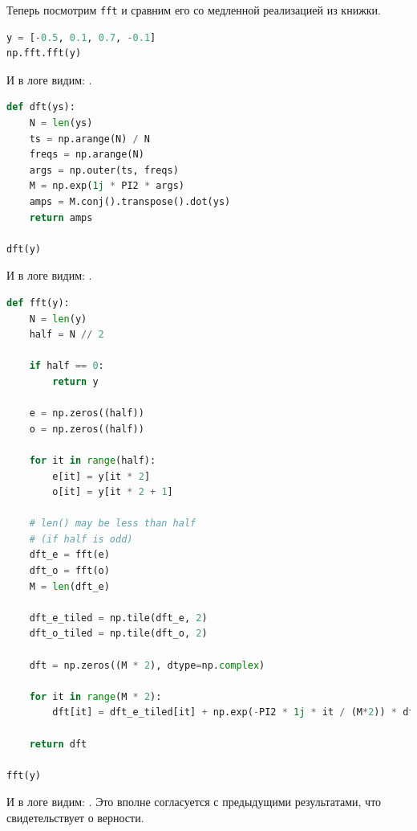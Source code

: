 \documentclass[a4paper,12pt]{report}
\begin{document}
    Теперь посмотрим  \texttt{fft} и сравним его со медленной реализацией из книжки.
    
\begin{lstlisting}[language=Python,caption=Точно верный ответ]
y = [-0.5, 0.1, 0.7, -0.1]
np.fft.fft(y)
\end{lstlisting}

    И в логе видим: .
    
\begin{lstlisting}[language=Python,caption=Реализация из книжки]
def dft(ys):
    N = len(ys)
    ts = np.arange(N) / N
    freqs = np.arange(N)
    args = np.outer(ts, freqs)
    M = np.exp(1j * PI2 * args)
    amps = M.conj().transpose().dot(ys)
    return amps

dft(y)
\end{lstlisting}

    И в логе видим: .
       
\begin{lstlisting}[language=Python,caption=Наш код]
def fft(y):
    N = len(y)
    half = N // 2
    
    if half == 0:
        return y
    
    e = np.zeros((half))
    o = np.zeros((half))
    
    for it in range(half):
        e[it] = y[it * 2]
        o[it] = y[it * 2 + 1]
        
    # len() may be less than half
    # (if half is odd)
    dft_e = fft(e)
    dft_o = fft(o)
    M = len(dft_e)
    
    dft_e_tiled = np.tile(dft_e, 2)
    dft_o_tiled = np.tile(dft_o, 2)
    
    dft = np.zeros((M * 2), dtype=np.complex)
    
    for it in range(M * 2):
        dft[it] = dft_e_tiled[it] + np.exp(-PI2 * 1j * it / (M*2)) * dft_o_tiled[it]
        
    return dft

fft(y)
\end{lstlisting}

    И в логе видим: . Это вполне согласуется с предыдущими результатами, что свидетельствует о верности.
    
    
\end{document}
